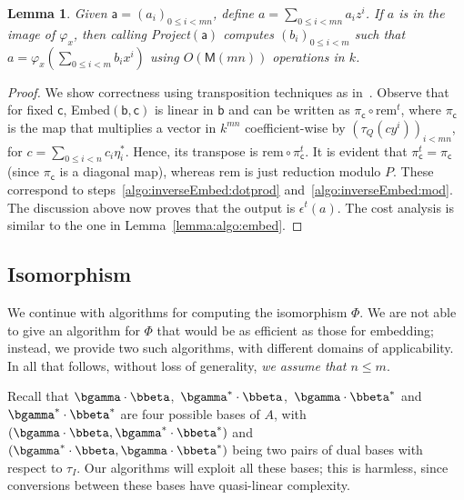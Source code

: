 \documentclass{sig-alternate}
\def\M {\ensuremath{\mathsf{M}}}
\def\va {\ensuremath{\mathsf{a}}}
\def\vb {\ensuremath{\mathsf{b}}}
\def\vc {\ensuremath{\mathsf{c}}}
\def\rem {\ensuremath{\mathrm{rem}}}
\newtheorem{Lemma}{Lemma}
\begin{document}
\begin{Lemma}
  Given $\va=(a_i)_{0 \le i < mn}$, define $a=\sum_{0 \le i < mn} a_i
  z^i$. If $a$ is in the image of $\varphi_x$, then calling {\em
    Project}$(\va)$ computes $(b_i)_{0 \le i < m}$ such that
  $a=\varphi_x(\sum_{0 \le i < m} b_i x^i)$ using $O(\M(mn))$
  operations in $k$.
\end{Lemma}
\begin{proof}
  We show correctness using transposition techniques as
  in~\cite{bostan+lecerf+schost:tellegen}. Observe that for fixed
  $\vc$, Embed$(\vb,\vc)$ is linear in $\vb$ and can be written as
  $\pi_\vc\circ\rem^t$, where $\pi_\vc$ is the map that multiplies a
  vector in $k^{mn}$ coefficient-wise by $(\tau_Q(c y^i))_{i<mn}$, for
  $c=\sum_{0 \le i < n} c_i \eta^\ast_i$.  Hence, its transpose is
  $\rem\circ\pi_\vc^t$. It is evident that $\pi_\vc^t=\pi_\vc$ (since
  $\pi_\vc$ is a diagonal map), whereas $\rem$ is just reduction
  modulo $P$. These correspond to
  steps~\ref{algo:inverseEmbed:dotprod}
  and~\ref{algo:inverseEmbed:mod}. The discussion above now proves
  that the output is $\epsilon^t(a)$. The cost analysis is similar to
  the one in Lemma~\ref{lemma:algo:embed}.
\end{proof}


\subsection{Isomorphism} 

We continue with algorithms for computing the isomorphism $\Phi$.  We
are not able to give an algorithm for $\Phi$ that would be as
efficient as those for embedding; instead, we provide two such
algorithms, with different domains of applicability. In all that
follows, without loss of generality, {\em we assume that $n\le m$}.

Recall that $\bgamma \cdot \bbeta$,\ $\bgamma^\ast \cdot
\bbeta$,\ $\bgamma \cdot \bbeta^\ast$ and $\bgamma^\ast \cdot
\bbeta^\ast$ are four possible bases of $A$, with $(\bgamma \cdot
\bbeta, \bgamma^\ast \cdot \bbeta^\ast)$ and $(\bgamma^\ast \cdot
\bbeta, \bgamma \cdot \bbeta^\ast)$ being two pairs of dual bases with
respect to $\tau_I$. Our algorithms will exploit all these bases; this
is harmless, since conversions between these bases have quasi-linear
complexity.
\end{document}
